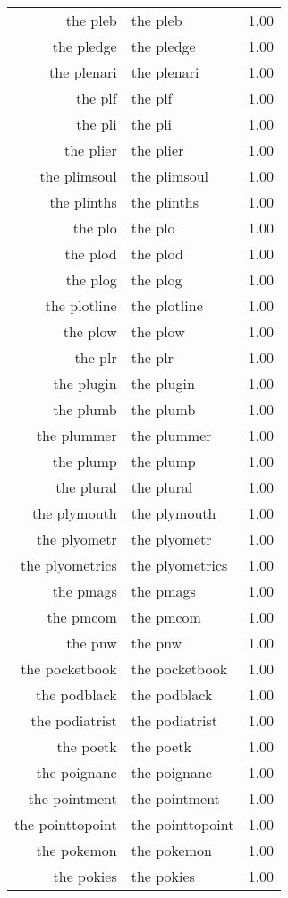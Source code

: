\begin{table}[ht]
\begin{tabular}{rlr}
  the pleb & the pleb & 1.00 \\ 
  the pledge & the pledge & 1.00 \\ 
  the plenari & the plenari & 1.00 \\ 
  the plf & the plf & 1.00 \\ 
  the pli & the pli & 1.00 \\ 
  the plier & the plier & 1.00 \\ 
  the plimsoul & the plimsoul & 1.00 \\ 
  the plinths & the plinths & 1.00 \\ 
  the plo & the plo & 1.00 \\ 
  the plod & the plod & 1.00 \\ 
  the plog & the plog & 1.00 \\ 
  the plotline & the plotline & 1.00 \\ 
  the plow & the plow & 1.00 \\ 
  the plr & the plr & 1.00 \\ 
  the plugin & the plugin & 1.00 \\ 
  the plumb & the plumb & 1.00 \\ 
  the plummer & the plummer & 1.00 \\ 
  the plump & the plump & 1.00 \\ 
  the plural & the plural & 1.00 \\ 
  the plymouth & the plymouth & 1.00 \\ 
  the plyometr & the plyometr & 1.00 \\ 
  the plyometrics & the plyometrics & 1.00 \\ 
  the pmags & the pmags & 1.00 \\ 
  the pmcom & the pmcom & 1.00 \\ 
  the pnw & the pnw & 1.00 \\ 
  the pocketbook & the pocketbook & 1.00 \\ 
  the podblack & the podblack & 1.00 \\ 
  the podiatrist & the podiatrist & 1.00 \\ 
  the poetk & the poetk & 1.00 \\ 
  the poignanc & the poignanc & 1.00 \\ 
  the pointment & the pointment & 1.00 \\ 
  the pointtopoint & the pointtopoint & 1.00 \\ 
  the pokemon & the pokemon & 1.00 \\ 
  the pokies & the pokies & 1.00 \\ 

\end{tabular}
\end{table}
